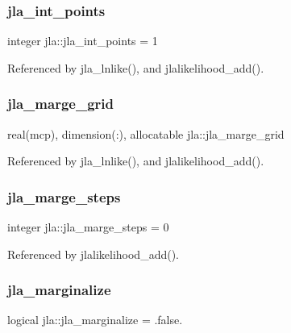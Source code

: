\subsubsection{\texorpdfstring{jla\+\_\+int\+\_\+points}{jla\_int\_points}}
{\footnotesize\ttfamily integer jla\+::jla\+\_\+int\+\_\+points = 1}



Referenced by jla\+\_\+lnlike(), and jlalikelihood\+\_\+add().

\mbox{\label{namespacejla_a9dc22edc44b8361f9204d217df48cd90}} 
\subsubsection{\texorpdfstring{jla\+\_\+marge\+\_\+grid}{jla\_marge\_grid}}
{\footnotesize\ttfamily real(mcp), dimension(\+:), allocatable jla\+::jla\+\_\+marge\+\_\+grid}



Referenced by jla\+\_\+lnlike(), and jlalikelihood\+\_\+add().

\mbox{\label{namespacejla_abdf521613e95b6b0873dc07e2182f08c}} 
\subsubsection{\texorpdfstring{jla\+\_\+marge\+\_\+steps}{jla\_marge\_steps}}
{\footnotesize\ttfamily integer jla\+::jla\+\_\+marge\+\_\+steps = 0}



Referenced by jlalikelihood\+\_\+add().

\mbox{\label{namespacejla_af9daaf320a7953866d9f29f7f569fbe4}} 
\subsubsection{\texorpdfstring{jla\+\_\+marginalize}{jla\_marginalize}}
{\footnotesize\ttfamily logical jla\+::jla\+\_\+marginalize = .false.}



